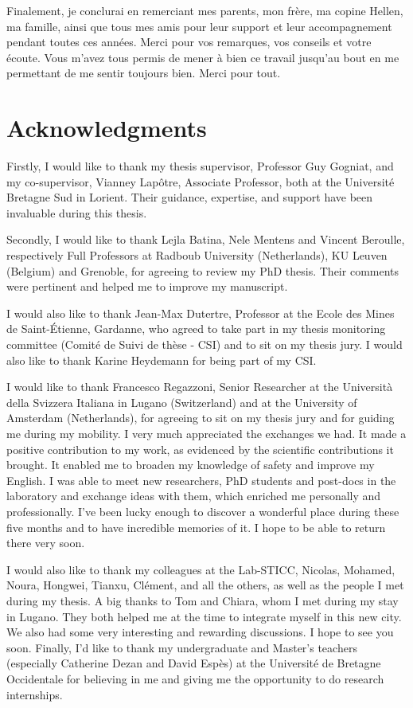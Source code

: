Finalement, je conclurai en remerciant mes parents, mon frère, ma copine Hellen, ma famille, ainsi que tous mes amis pour leur support et leur accompagnement pendant toutes ces années. Merci pour vos remarques, vos conseils et votre écoute. Vous m'avez tous permis de mener à bien ce travail jusqu'au bout en me permettant de me sentir toujours bien.
Merci pour tout.

\chapter*{Acknowledgments}

Firstly, I would like to thank my thesis supervisor, Professor Guy Gogniat, and my co-supervisor, Vianney Lapôtre, Associate Professor, both at the Université Bretagne Sud in Lorient. Their guidance, expertise, and support have been invaluable during this thesis.

Secondly, I would like to thank Lejla Batina, Nele Mentens and Vincent Beroulle, respectively Full Professors at Radboub University (Netherlands), KU Leuven (Belgium) and Grenoble, for agreeing to review my PhD thesis. Their comments were pertinent and helped me to improve my manuscript.

I would also like to thank Jean-Max Dutertre, Professor at the Ecole des Mines de Saint-Étienne, Gardanne, who agreed to take part in my thesis monitoring committee (Comité de Suivi de thèse - CSI) and to sit on my thesis jury. I would also like to thank Karine Heydemann for being part of my CSI.

I would like to thank Francesco Regazzoni, Senior Researcher at the Università della Svizzera Italiana in Lugano (Switzerland) and at the University of Amsterdam (Netherlands), for agreeing to sit on my thesis jury and for guiding me during my mobility. I very much appreciated the exchanges we had. It made a positive contribution to my work, as evidenced by the scientific contributions it brought. It enabled me to broaden my knowledge of safety and improve my English. I was able to meet new researchers, PhD students and post-docs in the laboratory and exchange ideas with them, which enriched me personally and professionally. I've been lucky enough to discover a wonderful place during these five months and to have incredible memories of it. I hope to be able to return there very soon.

I would also like to thank my colleagues at the Lab-STICC, Nicolas, Mohamed, Noura, Hongwei, Tianxu, Clément, and all the others, as well as the people I met during my thesis. A big thanks to Tom and Chiara, whom I met during my stay in Lugano. They both helped me at the time to integrate myself in this new city. We also had some very interesting and rewarding discussions. I hope to see you soon. Finally, I'd like to thank my undergraduate and Master's teachers (especially Catherine Dezan and David Espès) at the Université de Bretagne Occidentale for believing in me and giving me the opportunity to do research internships.


